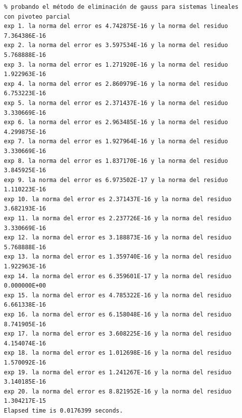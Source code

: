 \documentclass{article}
\begin{document}
\begin{lstlisting}
% probando el método de eliminación de gauss para sistemas lineales con pivoteo parcial
exp 1. la norma del error es 4.742875E-16 y la norma del residuo 7.364386E-16
exp 2. la norma del error es 3.597534E-16 y la norma del residuo 5.768888E-16
exp 3. la norma del error es 1.271920E-16 y la norma del residuo 1.922963E-16
exp 4. la norma del error es 2.860979E-16 y la norma del residuo 6.753223E-16
exp 5. la norma del error es 2.371437E-16 y la norma del residuo 3.330669E-16
exp 6. la norma del error es 2.963485E-16 y la norma del residuo 4.299875E-16
exp 7. la norma del error es 1.927964E-16 y la norma del residuo 3.330669E-16
exp 8. la norma del error es 1.837170E-16 y la norma del residuo 3.845925E-16
exp 9. la norma del error es 6.973502E-17 y la norma del residuo 1.110223E-16
exp 10. la norma del error es 2.371437E-16 y la norma del residuo 3.682193E-16
exp 11. la norma del error es 2.237726E-16 y la norma del residuo 3.330669E-16
exp 12. la norma del error es 3.188873E-16 y la norma del residuo 5.768888E-16
exp 13. la norma del error es 1.359740E-16 y la norma del residuo 1.922963E-16
exp 14. la norma del error es 6.359601E-17 y la norma del residuo 0.000000E+00
exp 15. la norma del error es 4.785322E-16 y la norma del residuo 6.661338E-16
exp 16. la norma del error es 6.158048E-16 y la norma del residuo 8.741905E-16
exp 17. la norma del error es 3.608225E-16 y la norma del residuo 4.154074E-16
exp 18. la norma del error es 1.012698E-16 y la norma del residuo 1.570092E-16
exp 19. la norma del error es 1.241267E-16 y la norma del residuo 3.140185E-16
exp 20. la norma del error es 8.821952E-16 y la norma del residuo 1.304217E-15
Elapsed time is 0.0176399 seconds.


\end{lstlisting}
\end{document}
